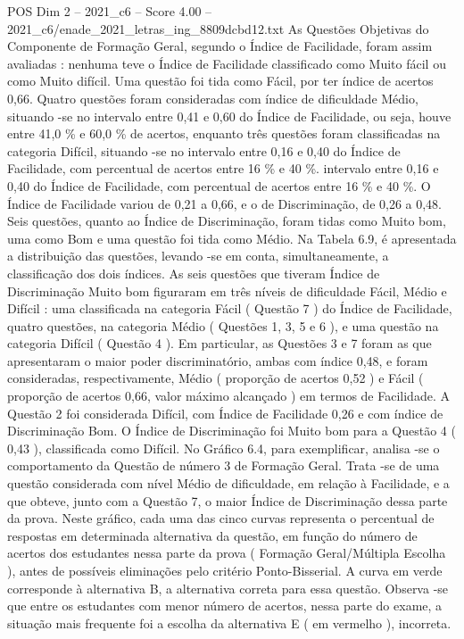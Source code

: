 \begin{textsample}{POS Dim 2 – 2021\_c6 – Score 4.00 – 2021\_c6/enade\_2021\_letras\_ing\_8809dcbd12.txt}
As Questões Objetivas do Componente de Formação Geral, segundo o Índice de Facilidade, foram assim avaliadas : nenhuma teve o Índice de Facilidade classificado como Muito fácil ou como Muito difícil.
Uma questão foi tida como Fácil, por ter índice de acertos 0,66.
Quatro questões foram consideradas com índice de dificuldade Médio, situando -se no intervalo entre 0,41 e 0,60 do Índice de Facilidade, ou seja, houve entre 41,0 \% e 60,0 \% de acertos, enquanto três questões foram classificadas na categoria Difícil, situando -se no intervalo entre 0,16 e 0,40 do Índice de Facilidade, com percentual de acertos entre 16 \% e 40 \%. intervalo entre 0,16 e 0,40 do Índice de Facilidade, com percentual de acertos entre 16 \% e 40 \%.
O Índice de Facilidade variou de 0,21 a 0,66, e o de Discriminação, de 0,26 a 0,48.
Seis questões, quanto ao Índice de Discriminação, foram tidas como Muito bom, uma como Bom e uma questão foi tida como Médio.
Na Tabela 6.9, é apresentada a distribuição das questões, levando -se em conta, simultaneamente, a classificação dos dois índices.
As seis questões que tiveram Índice de Discriminação Muito bom figuraram em três níveis de dificuldade Fácil, Médio e Difícil : uma classificada na categoria Fácil ( Questão 7 ) do Índice de Facilidade, quatro questões, na categoria Médio ( Questões 1, 3, 5 e 6 ), e uma questão na categoria Difícil ( Questão 4 ).
Em particular, as Questões 3 e 7 foram as que apresentaram o maior poder discriminatório, ambas com índice 0,48, e foram consideradas, respectivamente, Médio ( proporção de acertos 0,52 ) e Fácil ( proporção de acertos 0,66, valor máximo alcançado ) em termos de Facilidade.
A Questão 2 foi considerada Difícil, com Índice de Facilidade 0,26 e com índice de Discriminação Bom.
O Índice de Discriminação foi Muito bom para a Questão 4 ( 0,43 ), classificada como Difícil.
No Gráfico 6.4, para exemplificar, analisa -se o comportamento da Questão de número 3 de Formação Geral.
Trata -se de uma questão considerada com nível Médio de dificuldade, em relação à Facilidade, e a que obteve, junto com a Questão 7, o maior Índice de Discriminação dessa parte da prova.
Neste gráfico, cada uma das cinco curvas representa o percentual de respostas em determinada alternativa da questão, em função do número de acertos dos estudantes nessa parte da prova ( Formação Geral/Múltipla Escolha ), antes de possíveis eliminações pelo critério Ponto-Bisserial.
A curva em verde corresponde à alternativa B, a alternativa correta para essa questão.
Observa -se que entre os estudantes com menor número de acertos, nessa parte do exame, a situação mais frequente foi a escolha da alternativa E ( em vermelho ), incorreta.

\end{textsample}
